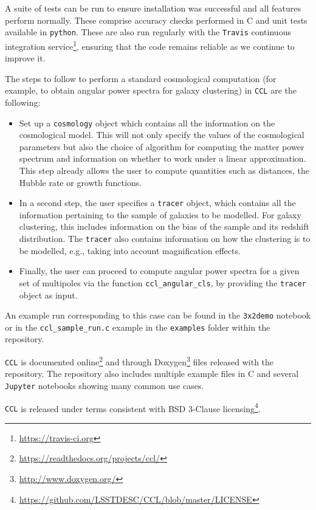 \documentclass[\docopts]{\docclass}
\newcommand{\ccl}{{\tt CCL}\xspace}
\begin{document}
A suite of tests can be run to ensure installation was successful and all features perform normally. These comprise accuracy checks performed in C and unit tests available in {\tt python}. These are also run regularly with the {\tt Travis} continuous integration service\footnote{\url{https://travis-ci.org}}, ensuring that the code remains reliable as we continue to improve it. 

The steps to follow to perform a standard cosmological computation (for example, to obtain angular power spectra for galaxy clustering) in \ccl are the following:
\begin{itemize}
\item Set up a {\tt cosmology} object which contains all the information on the cosmological model. This will not only specify the values of the cosmological parameters but also the choice of algorithm for computing the matter power spectrum and information on whether to work under a linear approximation. This step already allows the user to compute quantities such as distances, the Hubble rate or growth functions.
\item In a second step, the user specifies a {\tt tracer} object, which contains all the information pertaining to the sample of galaxies to be modelled. For galaxy clustering, this includes information on the bias of the sample and its redshift distribution. The {\tt tracer} also contains information on how the clustering is to be modelled, e.g., taking into account magnification effects. 
\item Finally, the user can proceed to compute angular power spectra for a given set of multipoles via the function {\tt ccl\_angular\_cls}, by providing the {\tt tracer} object as input.
\end{itemize}
An example run corresponding to this case can be found in the {\tt 3x2demo} notebook or in the {\tt ccl\_sample\_run.c} example in the {\tt examples} folder within the repository.

\ccl is documented online\footnote{\url{https://readthedocs.org/projects/ccl/}} and through Doxygen\footnote{\url{http://www.doxygen.org/}} files released with the repository. The repository also includes multiple example files in C and several {\tt Jupyter} notebooks showing many common use cases.

\ccl is released under terms consistent with BSD 3-Clause licensing\footnote{\url{https://github.com/LSSTDESC/CCL/blob/master/LICENSE}}.

\end{document}
